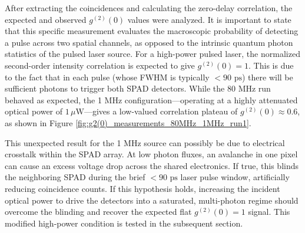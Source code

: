 \begin{table}[htbp]
    \centering
    \caption{Optical path delays via \texttt{tt.Correlation} (10 ps resolution)}
    \label{tab:delays}
\end{table}

After extracting the coincidences and calculating the zero-delay correlation, the expected and observed $g^{(2)}(0)$ values were analyzed. It is important to state that this specific measurement evaluates the macroscopic probability of detecting a pulse across two spatial channels, as opposed to the intrinsic quantum photon statistics of the pulsed laser source. 
For a high-power pulsed laser, the normalized second-order intensity correlation is expected to give $g^{(2)}(0) = 1$. 
This is due to the fact that in each pulse (whose FWHM is typically $< 90\text{ ps}$) there will be sufficient photons to trigger both SPAD detectors. 
While the 80 MHz run behaved as expected, the 1 MHz configuration—operating at a highly attenuated optical power of $1 \, \mu\text{W}$—gives a low-valued correlation plateau of $g^{(2)}(0) \approx 0.6$, as shown in Figure \ref{fig:g2(0)_measurements_80MHz_1MHz_run1}. 

This unexpected result for the 1 MHz source can possibly be due to electrical crosstalk within the SPAD array. 
At low photon fluxes, an avalanche in one pixel can cause an excess voltage drop across the shared electronics. 
If true, this blinds the neighboring SPAD during the brief $< 90\text{ ps}$ laser pulse window, artificially reducing coincidence counts. 
If this hypothesis holds, increasing the incident optical power to drive the detectors into a saturated, multi-photon regime should overcome the blinding and recover the expected flat $g^{(2)}(0) = 1$ signal. 
This modified high-power condition is tested in the subsequent section.


